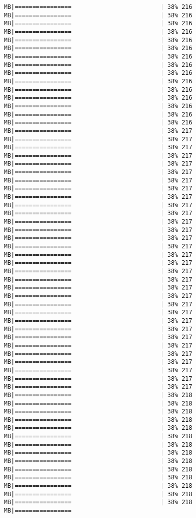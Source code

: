 \documentclass[
]{article}
\begin{document}
\begin{verbatim}
MB|================                         | 38% 216 MB|================                         | 38% 216 MB|================                         | 38% 216 MB|================                         | 38% 216 MB|================                         | 38% 216 MB|================                         | 38% 216 MB|================                         | 38% 216 MB|================                         | 38% 216 MB|================                         | 38% 216 MB|================                         | 38% 216 MB|================                         | 38% 216 MB|================                         | 38% 216 MB|================                         | 38% 216 MB|================                         | 38% 216 MB|================                         | 38% 216 MB|================                         | 38% 217 MB|================                         | 38% 217 MB|================                         | 38% 217 MB|================                         | 38% 217 MB|================                         | 38% 217 MB|================                         | 38% 217 MB|================                         | 38% 217 MB|================                         | 38% 217 MB|================                         | 38% 217 MB|================                         | 38% 217 MB|================                         | 38% 217 MB|================                         | 38% 217 MB|================                         | 38% 217 MB|================                         | 38% 217 MB|================                         | 38% 217 MB|================                         | 38% 217 MB|================                         | 38% 217 MB|================                         | 38% 217 MB|================                         | 38% 217 MB|================                         | 38% 217 MB|================                         | 38% 217 MB|================                         | 38% 217 MB|================                         | 38% 217 MB|================                         | 38% 217 MB|================                         | 38% 217 MB|================                         | 38% 217 MB|================                         | 38% 217 MB|================                         | 38% 217 MB|================                         | 38% 217 MB|================                         | 38% 217 MB|================                         | 38% 217 MB|================                         | 38% 217 MB|================                         | 38% 218 MB|================                         | 38% 218 MB|================                         | 38% 218 MB|================                         | 38% 218 MB|================                         | 38% 218 MB|================                         | 38% 218 MB|================                         | 38% 218 MB|================                         | 38% 218 MB|================                         | 38% 218 MB|================                         | 38% 218 MB|================                         | 38% 218 MB|================                         | 38% 218 MB|================                         | 38% 218 MB|================                         | 38% 218 MB|================      
\end{verbatim}
\end{document}

